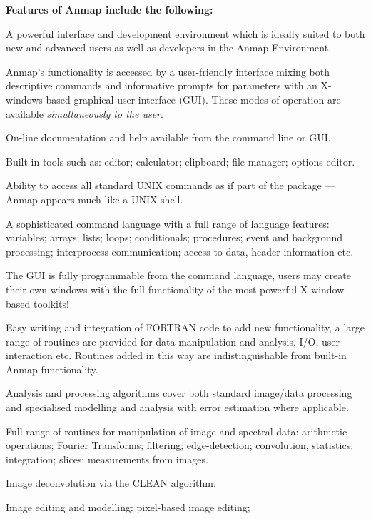 {\bf Features of Anmap include the following:}
\begin{npars}
\item A powerful interface and development environment
which is ideally suited to both new and advanced users
as well as developers in the Anmap Environment.
\begin{rpars}
\item Anmap's functionality is accessed by
a user-friendly interface mixing both descriptive
commands and informative prompts for parameters with an
X-windows based graphical user interface (GUI). These modes
of operation are available {\em simultaneously to the user}.
\item On-line documentation and help available from the command
line or GUI.
\item Built in tools such as: editor; calculator; 
clipboard; file manager; options editor.
\item Ability to access all standard UNIX commands as if
part of the package --- Anmap appears much like a UNIX
shell.
\item A sophisticated command language with a full range of
language features: variables; arrays; lists; loops; 
conditionals; procedures; event and background processing; 
interprocess communication; access to data,
header information etc.
\item The GUI is fully programmable from the command language,
users may create their own windows with the full functionality
of the most powerful X-window based toolkits!
\item Easy writing and integration of FORTRAN code to add new
functionality, a large range of routines are provided for
data manipulation and analysis, I/O, user interaction etc.
Routines added in this way are indistinguishable from built-in
Anmap functionality.
\end{rpars}
\newpage
\item Analysis and processing algorithms cover both standard
image/data processing and specialised modelling and analysis
with error estimation where applicable.
\begin{rpars}
\item Full range of routines for manipulation of
image and spectral data: arithmetic operations; Fourier
Transforms; filtering; edge-detection; convolution, statistics; 
integration; slices; measurements from images.
\item Image deconvolution via the CLEAN algorithm.
\item Image editing and modelling: pixel-based image editing;

\end{rpars}
\end{npars}
